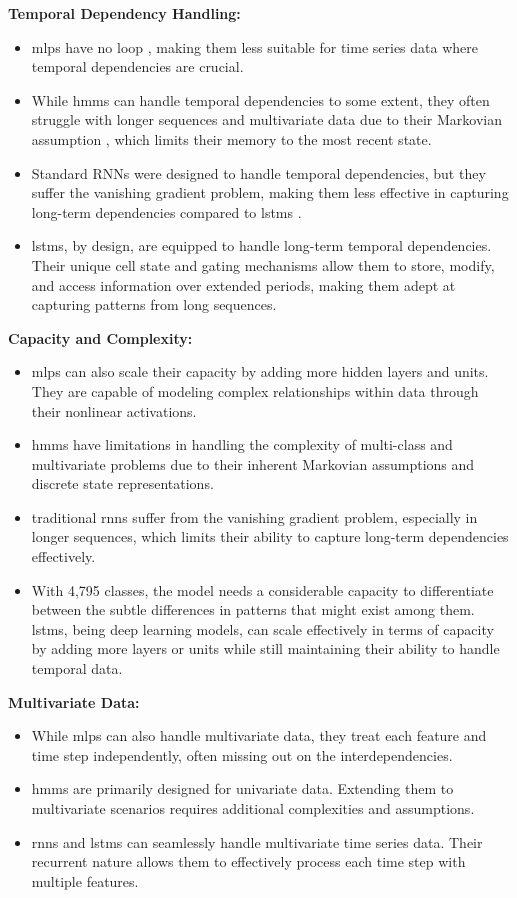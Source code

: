 \textbf{Temporal Dependency Handling:}
\begin{itemize}
    \item \acp{mlp} have no loop \cite{mlp_and_nn}, making them less suitable for time series data where temporal dependencies are crucial.
    \item While \acp{hmm} can handle temporal dependencies to some extent, they often struggle with longer sequences and multivariate data due to their Markovian assumption \cite{hmm-rabiner-1989}, which limits their memory to the most recent state.
    \item Standard RNNs were designed to handle temporal dependencies, but they suffer the vanishing gradient problem, making them less effective in capturing long-term dependencies compared to \acp{lstm} \cite{rnn_difficulties_2013}.
    \item \acp{lstm}, by design, are equipped to handle long-term temporal dependencies. Their unique cell state and gating mechanisms allow them to store, modify, and access information over extended periods, making them adept at capturing patterns from long sequences. \cite{lstm-hochreiter}
\end{itemize}

\textbf{Capacity and Complexity:}
\begin{itemize}
    \item \acp{mlp} can also scale their capacity by adding more hidden layers and units. They are capable of modeling complex relationships within data through their nonlinear activations.
    \item \acp{hmm} have limitations in handling the complexity of multi-class and multivariate problems due to their inherent Markovian assumptions and discrete state representations.
    \item traditional \acp{rnn} suffer from the vanishing gradient problem, especially in longer sequences, which limits their ability to capture long-term dependencies effectively. \cite{rnn_difficulties_2013}
    \item With 4,795 classes, the model needs a considerable capacity to differentiate between the subtle differences in patterns that might exist among them. \acp{lstm}, being deep learning models, can scale effectively in terms of capacity by adding more layers or units while still maintaining their ability to handle temporal data.
\end{itemize}

\textbf{Multivariate Data:}
\begin{itemize}
    \item While \acp{mlp} can also handle multivariate data, they treat each feature and time step independently, often missing out on the interdependencies.
    \item \acp{hmm} are primarily designed for univariate data. Extending them to multivariate scenarios requires additional complexities and assumptions.
    \item \acp{rnn} and \acp{lstm} can seamlessly handle multivariate time series data. Their recurrent nature allows them to effectively process each time step with multiple features.
\end{itemize}

